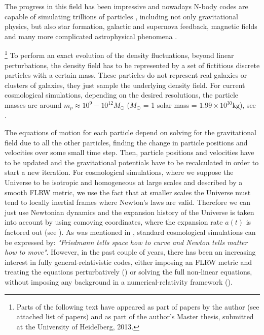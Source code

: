 The progress in this field has been impressive and nowadays N-body codes are capable
of simulating trillions of particles , including not only 
gravitational physics, but also star formation, galactic and supernova feedback, magnetic fields and
many more complicated astrophysical phenomena .

\footnote{Parts of the following text have appeared as part of papers by the author 
	(see attached list of papers)
and as part of the author's Master thesis, submitted at the University of Heidelberg, 2013.}
To perform an exact evolution of the density fluctuations, beyond
linear perturbations, the density field has to be represented by a
set of fictitious discrete particles with a certain mass. These particles
do not represent real galaxies or clusters of galaxies, they just
sample the underlying density field. For current cosmological simulations,
depending on the desired resolutions, the particle masses are around
$m_{p}\approx10^{9}-10^{12}M_{\odot}$ ($M_{\odot}$ = 1 solar mass = $1.99 \times 10^{30} \mathrm{kg}$), see \citet{kuhlen_numerical_2012}.


The equations of motion for each particle depend on solving for the
gravitational field due to all the other particles, finding the change
in particle positions and velocities over some small time step. Then,
particle positions and velocities have to be updated and the gravitational
potentials have to be recalculated in order to start a new iteration. For cosmological
simulations, where we suppose the Universe to be isotropic and homogeneous
at large scales and described by a smooth FLRW metric, we use the
fact that at smaller scales the Universe must tend to locally inertial
frames where Newton's laws are valid. Therefore we can just use Newtonian
dynamics and the expansion history of the Universe is taken into account
by using comoving coordinates, where the expansion rate $a(t)$ is
factored out (see \citet{peacock_cosmological_1999,dehnen_n-body_2011}).
As was mentioned in , standard cosmological simulations
can be expressed by:
\emph{"Friedmann tells space how to curve and Newton tells matter how to move"}.
However, in the past couple of years, there has been an increasing interest
in fully general-relativistic codes, either imposing an FLRW metric and treating the equations
perturbatively () or solving the full non-linear 
equations, without imposing any background in a numerical-relativity framework ().



